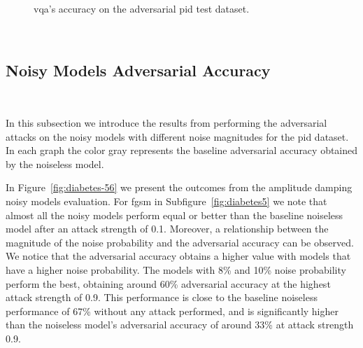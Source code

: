 \begin{figure}[!h]
  \caption{\ac{vqa}'s accuracy on the adversarial \ac{pid} test dataset.}
  \label{fig:diabetes-34}
\end{figure} \

\subsection{Noisy Models Adversarial Accuracy}\label{subsection:diabetes-noisy-adv-acc} \

In this subsection we introduce the results from performing
the adversarial attacks on the noisy models with different noise
magnitudes for the \ac{pid} dataset. In each graph the color gray
represents the baseline adversarial accuracy obtained by the
noiseless model. \

In Figure~\ref{fig:diabetes-56} we present the outcomes from the amplitude
damping noisy models evaluation. For \ac{fgsm} in Subfigure~\ref{fig:diabetes5}
we note that almost all the noisy models perform equal or better than the
baseline noiseless model after an attack strength of 0.1. Moreover,
a relationship between the magnitude of the noise probability and
the adversarial accuracy can be observed. We notice that the adversarial
accuracy obtains a higher value with models that have a higher noise
probability. The models with 8\% and 10\% noise probability perform
the best, obtaining around 60\% adversarial accuracy at the highest attack
strength of 0.9. This performance is close to the baseline noiseless
performance of 67\% without any attack performed, and is significantly
higher than the noiseless model's adversarial accuracy of around 33\%
at attack strength 0.9. \

